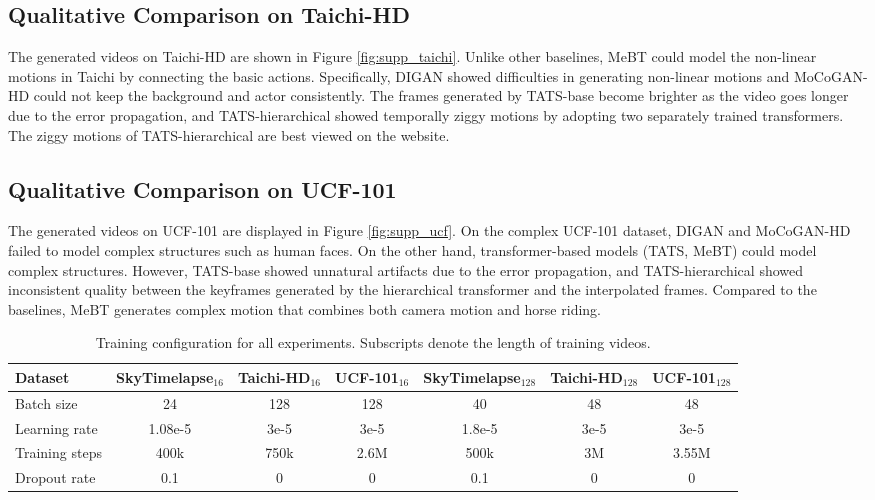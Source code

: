 \documentclass[10pt,twocolumn,letterpaper]{article}
\begin{document}
\subsection{Qualitative Comparison on Taichi-HD}
The generated videos on Taichi-HD are shown in Figure \ref{fig:supp_taichi}. Unlike other baselines, MeBT could model the non-linear motions in Taichi by connecting the basic actions. Specifically, DIGAN showed difficulties in generating non-linear motions and MoCoGAN-HD could not keep the background and actor consistently. The frames generated by TATS-base become brighter as the video goes longer due to the error propagation, and TATS-hierarchical showed temporally ziggy motions by adopting two separately trained transformers. The ziggy motions of TATS-hierarchical are best viewed on the website.

\subsection{Qualitative Comparison on UCF-101}
The generated videos on UCF-101 are displayed in Figure \ref{fig:supp_ucf}. On the complex UCF-101 dataset, DIGAN and MoCoGAN-HD failed to model complex structures such as human faces. On the other hand, transformer-based models (TATS, MeBT) could model complex structures. However, TATS-base showed unnatural artifacts due to the error propagation, and TATS-hierarchical showed inconsistent quality between the keyframes generated by the hierarchical transformer and the interpolated frames. Compared to the baselines, MeBT generates complex motion that combines both camera motion and horse riding.





\begin{table*}[t]
    \centering
    \caption{Training configuration for all experiments. Subscripts denote the length of training videos.}
    \label{tab:train_config}
    \begin{tabular}{l|cccccc}
    \toprule
    Dataset & SkyTimelapse$_{16}$ & Taichi-HD$_{16}$ & UCF-101$_{16}$ & SkyTimelapse$_{128}$ & Taichi-HD$_{128}$& UCF-101$_{128}$\\
    \midrule
    Batch size & 24 & 128 & 128 & 40 & 48 & 48\\
    Learning rate & 1.08e-5 & 3e-5 & 3e-5 & 1.8e-5 & 3e-5 & 3e-5\\
    Training steps & 400k & 750k & 2.6M & 500k & 3M & 3.55M \\
    Dropout rate & 0.1 & 0 & 0 & 0.1 & 0 & 0 \\
    \bottomrule
    \end{tabular}
\end{table*}
\end{document}
